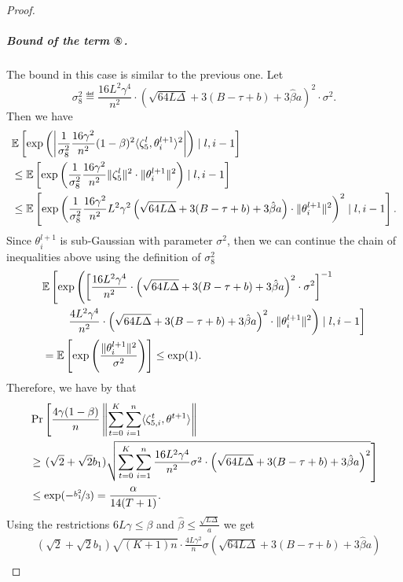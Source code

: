 \documentclass[a4paper,11pt]{article}
\begin{document}
\begin{proof}
    \subparagraph{Bound of the term $\circledEight$.} The bound in this case is similar to the previous one. Let
    \[
        \sigma^2_8 \eqdef \frac{16L^2\gamma^4}{n^2}\cdot \left(\sqrt{64L\Delta} +3(B-\tau+b)+3\hat{\beta}a\right)^2\cdot \sigma^2.
    \]
    Then we have 
    \begin{align*}
    &\E{\exp\left(\left|\frac{1}{\sigma^2_8}\frac{16\gamma^2}{n^2}(1-\beta)^2\<\zeta^l_{5},\theta^{l+1}_i>^2\right|\right)\mid l,i-1}\\
    &\le 
    \E{\exp\left(\frac{1}{\sigma^2_8}\frac{16\gamma^2}{n^2}\|\zeta_{5}^l\|^2 \cdot \|\theta^{l+1}_i\|^2\right)\mid l,i-1}\\
    &\le \E{\exp\left(\frac{1}{\sigma^2_8}\frac{16\gamma^2}{n^2}L^2\gamma^2\left(\sqrt{64L\Delta} +3(B-\tau+b)+3\hat{\beta}a\right) \cdot \|\theta^{l+1}_i\|^2\right)^2\mid l,i-1}.
    \end{align*}
    Since $\theta^{l+1}_i$ is sub-Gaussian with parameter $\sigma^2$, then we can continue the chain of inequalities above using the definition of $\sigma_8^2$
    \begin{align*}
        &\mathbb{E}\left[\exp\left(\left[\frac{16L^2\gamma^4}{n^2}\cdot \left(\sqrt{64L\Delta} +3(B-\tau+b)+3\hat{\beta}a\right)^2\cdot \sigma^2\right]^{-1}  \right.\right.\\
        &\qquad \left.\left. \frac{4L^2\gamma^4}{n^2}\cdot \left(\sqrt{64L\Delta} +3(B-\tau+b)+3\hat{\beta}a\right)^2\cdot\|\theta^{l+1}_i\|^2\right)\mid l,i-1\right]\\
        &= \mathbb{E}\left[\exp\left(\frac{\|\theta^{l+1}_i\|^2}{\sigma^2}\right)\right] \le \exp(1).
    \end{align*}
    Therefore, we have by  that 
    \begin{align*}
    &\Pr\left[\frac{4\gamma(1-\beta)}{n}\left\|\sum_{t=0}^K\sum_{i=1}^n\<\zeta_{5,i}^t,\theta^{t+1}>\right\|\right.\\ 
    &\ge \left. (\sqrt{2}+\sqrt{2}b_1)\sqrt{\sum_{t=0}^K\sum_{i=1}^n \frac{16L^2\gamma^4}{n^2}\sigma^2\cdot \left(\sqrt{64L\Delta} +3(B-\tau+b)+3\hat{\beta}a\right)^2}\right]\\ 
    &\le \exp(-\nicefrac{b_1^2}{3}) = \frac{\alpha}{14(T+1)}.
    \end{align*}
    Using the restrictions $6L\gamma\le \beta$ and $\hat{\beta}\le \frac{\sqrt{L\Delta}}{a}$ we get
    \begin{align*}
    &(\sqrt{2}+\sqrt{2}b_1)\sqrt{(K+1)n} \cdot \frac{4L\gamma^2}{n}\sigma\left(\sqrt{64L\Delta} +3(B-\tau+b)+3\hat{\beta}a\right)\\

\end{align*}
\end{proof}
\end{document}
